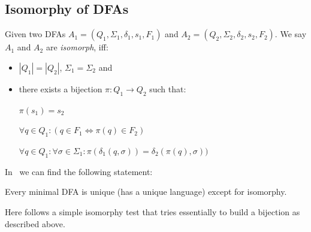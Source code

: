 \subsection{Isomorphy of DFAs}\label{ch:1:sec:isom}

Given two DFAs $A_1 = (Q_1, \Sigma_1, \delta_1, s_1, F_1)$ and $A_2 = (Q_2, \Sigma_2, \delta_2, s_2, F_2)$. We say $A_1$ and $A_2$ are \emph{isomorph}, iff:
\begin{itemize}
	\item $|Q_1| = |Q_2|$, $\Sigma_1 = \Sigma_2$ and
	\item there exists a bijection $\pi\colon Q_1 \to Q_2$ such that:
	
	$\pi(s_1) = s_2$
	
	$\forall q\in Q_1\colon (q\in F_1 \Longleftrightarrow \pi(q)\in F_2)$
	
	$\forall q\in Q_1\colon \forall\sigma\in\Sigma_1\colon \pi(\delta_1(q,\sigma))=\delta_2(\pi(q),\sigma))$
\end{itemize}
In~\cite[p. 45]{Sch01} we can find the following statement:
\begin{theorem}\label{ch:1:thm:uniq-ism}
	Every minimal DFA is unique (has a unique language) except for isomorphy.
\end{theorem}
Here follows a simple isomorphy test that tries essentially to build a bijection as described above.
\vspace{0.2cm}
